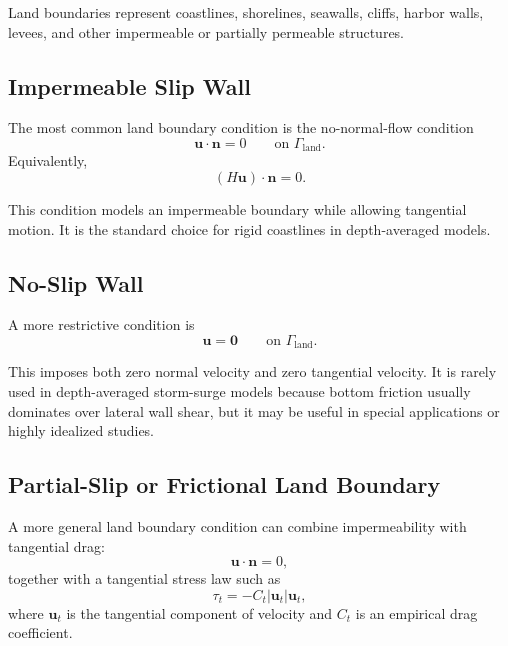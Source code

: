 \documentclass[11pt]{article}
\begin{document}
Land boundaries represent coastlines, shorelines, seawalls, cliffs, harbor walls, levees, and other impermeable or partially permeable structures.

\subsection{Impermeable Slip Wall}

The most common land boundary condition is the no-normal-flow condition
\begin{equation}
\bm{u}\cdot\bm{n} = 0
\qquad \text{on } \Gamma_{\mathrm{land}}.
\end{equation}
Equivalently,
\begin{equation}
(H\bm{u})\cdot\bm{n} = 0.
\end{equation}

This condition models an impermeable boundary while allowing tangential motion. It is the standard choice for rigid coastlines in depth-averaged models.

\subsection{No-Slip Wall}

A more restrictive condition is
\begin{equation}
\bm{u} = \bm{0}
\qquad \text{on } \Gamma_{\mathrm{land}}.
\end{equation}

This imposes both zero normal velocity and zero tangential velocity. It is rarely used in depth-averaged storm-surge models because bottom friction usually dominates over lateral wall shear, but it may be useful in special applications or highly idealized studies.

\subsection{Partial-Slip or Frictional Land Boundary}

A more general land boundary condition can combine impermeability with tangential drag:
\begin{equation}
\bm{u}\cdot\bm{n} = 0,
\end{equation}
together with a tangential stress law such as
\begin{equation}
\tau_t = - C_t |\bm{u}_t| \bm{u}_t,
\end{equation}
where \(\bm{u}_t\) is the tangential component of velocity and \(C_t\) is an empirical drag coefficient.
\end{document}
